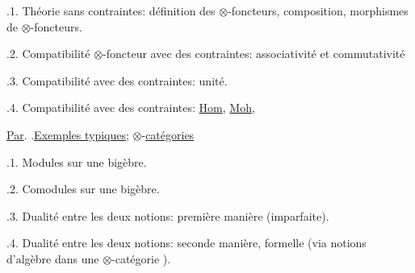 .1. Théorie sans contraintes: définition des $\otimes$-foncteurs, composition, morphismes de $\otimes$-foncteurs.

.2. Compatibilité  $\otimes$-foncteur avec des contraintes: associativité et commutativité\handwritten{!}

.3. Compatibilité avec des contraintes: unité.

.4. Compatibilité avec des contraintes: \uline{Hom}, \uline{Moh}, 


\uline{Par}. .\qquad \uline{Exemples typiques;} $\otimes$-\uline{catégories}


.1. Modules sur une bigèbre.

.2. Comodules sur une bigèbre.

.3. Dualité entre les deux notions: première manière (imparfaite).

.4. Dualité entre les deux notions: seconde manière, formelle (via  notions d'algèbre dans une $\otimes$-catégorie ).

